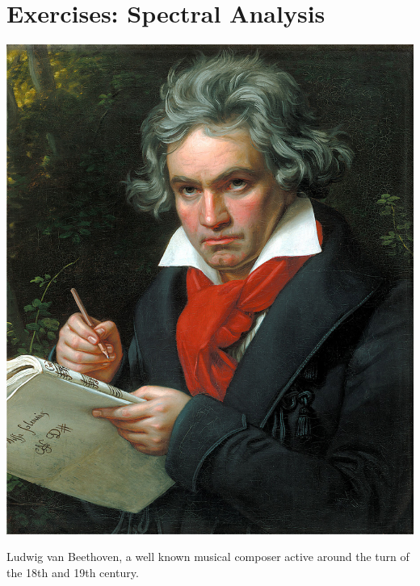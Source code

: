 \newpage
\section{Exercises: Spectral Analysis}

\begin{marginfigure}
\begin{center}
    \includegraphics[height=0.25\textheight]{ch16/figures/Beethoven.jpg}
\end{center}
\caption{Ludwig van Beethoven, a well known musical composer active around the turn of the 18th and 19th century.}
\label{fig:beet}
\end{marginfigure}

